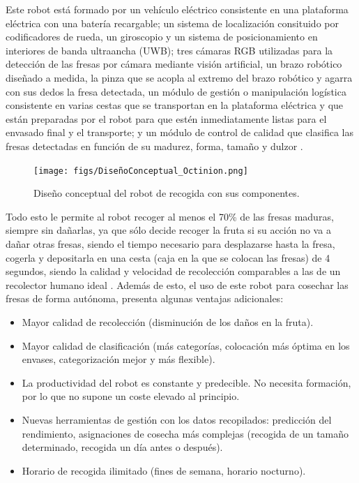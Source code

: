 Este robot está formado por un vehículo eléctrico consistente en una plataforma eléctrica con una batería recargable; un sistema de localización consituido por codificadores de rueda, un giroscopio y un sistema de posicionamiento en interiores de banda ultraancha (UWB); tres cámaras RGB utilizadas para la detección de las fresas por cámara mediante visión artificial, un brazo robótico diseñado a medida, la pinza que se acopla al extremo del brazo robótico y agarra con sus dedos la fresa detectada, un módulo de gestión o manipulación logística consistente en varias cestas que se transportan en la plataforma eléctrica y que están preparadas por el robot para que estén inmediatamente listas para el envasado final y el transporte; y un módulo de control de calidad que clasifica las fresas detectadas en función de su madurez, forma, tamaño y dulzor \cite{DePreter18}.

\begin{figure} [h!]
    \begin{center}
      \texttt{[image: figs/DiseñoConceptual\_Octinion.png]}
    \end{center}
    \caption{Diseño conceptual del robot de recogida con sus componentes.}
    \label{fig:DiseñoConceptual_Octinion}
\end{figure}

Todo esto le permite al robot recoger al menos el 70\% de las fresas maduras, siempre sin dañarlas, ya que sólo decide recoger la fruta si su acción no va a dañar otras fresas, siendo el tiempo necesario para desplazarse hasta la fresa, cogerla y depositarla en una cesta (caja en la que se colocan las
fresas) de 4 segundos, siendo la calidad y velocidad de recolección comparables a las de un recolector humano ideal \cite{DePreter18}. Además de esto, el uso de este robot para cosechar las fresas de forma autónoma, presenta algunas ventajas adicionales:

\begin{itemize}
    \item Mayor calidad de recolección (disminución de los daños en la fruta).
    \item Mayor calidad de clasificación (más categorías, colocación más óptima 								en los envases, categorización mejor y más flexible).
    \item La productividad del robot es constante y predecible. No necesita formación, por lo que no supone un coste elevado al principio.
    \item Nuevas herramientas de gestión con los datos recopilados: predicción del rendimiento, asignaciones de cosecha más complejas (recogida de un tamaño
determinado, recogida un día antes o después).
    \item Horario de recogida ilimitado (fines de semana, horario nocturno).
\end{itemize}

